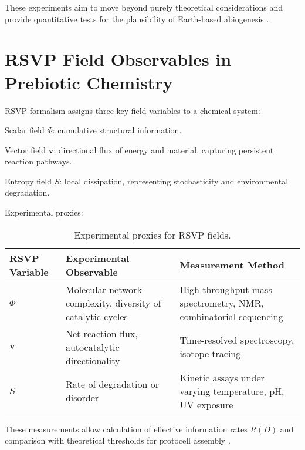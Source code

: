 \documentclass{book}
\begin{document}
These experiments aim to move beyond purely theoretical considerations and provide quantitative tests for the plausibility of Earth-based abiogenesis \citep{sokolskyi2024}.

\section{RSVP Field Observables in Prebiotic Chemistry}
RSVP formalism assigns three key field variables to a chemical system:

Scalar field $\Phi$: cumulative structural information.

Vector field $\mathbf{v}$: directional flux of energy and material, capturing persistent reaction pathways.

Entropy field $S$: local dissipation, representing stochasticity and environmental degradation.

Experimental proxies:

\begin{table}[h]
\centering
\begin{tabular}{lll}
\toprule
RSVP Variable & Experimental Observable & Measurement Method \\
\midrule
$\Phi$ & Molecular network complexity, diversity of catalytic cycles & High-throughput mass spectrometry, NMR, combinatorial sequencing \\
$\mathbf{v}$ & Net reaction flux, autocatalytic directionality & Time-resolved spectroscopy, isotope tracing \\
$S$ & Rate of degradation or disorder & Kinetic assays under varying temperature, pH, UV exposure \\
\bottomrule
\end{tabular}
\caption{Experimental proxies for RSVP fields.}
\end{table}

These measurements allow calculation of effective information rates $R(D)$ and comparison with theoretical thresholds for protocell assembly \citep{peng2022}.
\end{document}
